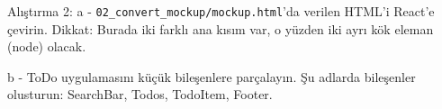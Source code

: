 \documentclass[presentation]{beamer}
\begin{document}
\begin{frame}[fragile,label={sec:org4b9cd72}]{Alıştırma 2:}
 a - \texttt{02\_convert\_mockup/mockup.html}'da verilen HTML'i React'e çevirin. Dikkat:
Burada iki farklı ana kısım var, o yüzden iki ayrı kök eleman (node) olacak.

b - ToDo uygulamasını küçük bileşenlere parçalayın. Şu adlarda bileşenler
olusturun: SearchBar, Todos, TodoItem, Footer.
\end{frame}
\end{document}
